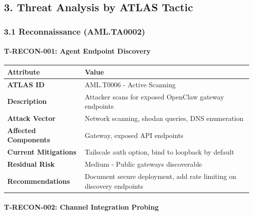 \hrulefill


\subsection{3. Threat Analysis by ATLAS Tactic}


\subsubsection{3.1 Reconnaissance (AML.TA0002)}


\paragraph{T-RECON-001: Agent Endpoint Discovery}



\begin{table}[h]
\centering
\small
\begin{tabular}{|l|l|}
\hline
Attribute & Value \\
\hline
\textbf{ATLAS ID} & AML.T0006 - Active Scanning \\
\hline
\textbf{Description} & Attacker scans for exposed OpenClaw gateway endpoints \\
\hline
\textbf{Attack Vector} & Network scanning, shodan queries, DNS enumeration \\
\hline
\textbf{Affected Components} & Gateway, exposed API endpoints \\
\hline
\textbf{Current Mitigations} & Tailscale auth option, bind to loopback by default \\
\hline
\textbf{Residual Risk} & Medium - Public gateways discoverable \\
\hline
\textbf{Recommendations} & Document secure deployment, add rate limiting on discovery endpoints \\
\hline
\end{tabular}
\end{table}



\paragraph{T-RECON-002: Channel Integration Probing}



